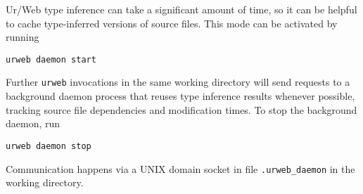 \documentclass{article}
\newcommand{\cd}[1]{\texttt{#1}}
\begin{document}
Ur/Web type inference can take a significant amount of time, so it can be helpful to cache type-inferred versions of source files.  This mode can be activated by running
\begin{verbatim}
urweb daemon start
\end{verbatim}
Further \cd{urweb} invocations in the same working directory will send requests to a background daemon process that reuses type inference results whenever possible, tracking source file dependencies and modification times.  To stop the background daemon, run
\begin{verbatim}
urweb daemon stop
\end{verbatim}
Communication happens via a UNIX domain socket in file \cd{.urweb\_daemon} in the working directory.

\medskip
\end{document}
